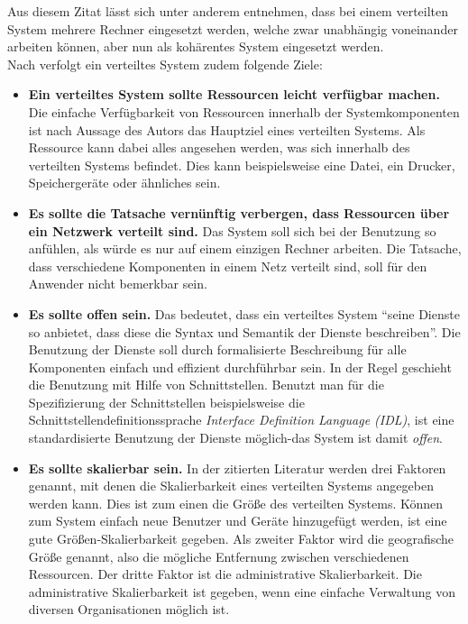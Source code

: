 Aus diesem Zitat lässt sich unter anderem entnehmen, dass bei einem verteilten System mehrere Rechner eingesetzt werden, welche zwar unabhängig voneinander arbeiten können, aber nun als kohärentes System eingesetzt werden. \\
Nach \citep{tanenbaum} verfolgt ein verteiltes System zudem folgende Ziele: 
\begin{itemize}
	\item \textbf{Ein verteiltes System sollte Ressourcen leicht verfügbar machen.}
	Die einfache Verfügbarkeit von Ressourcen innerhalb der Systemkomponenten ist nach Aussage des Autors das Hauptziel eines verteilten Systems. Als Ressource kann dabei alles angesehen werden, was sich innerhalb des verteilten Systems befindet. Dies kann beispielsweise eine Datei, ein Drucker, Speichergeräte oder ähnliches sein. 
	\item \textbf{Es sollte die Tatsache vernünftig verbergen, dass Ressourcen über ein Netzwerk verteilt sind.}
	Das System soll sich bei der Benutzung so anfühlen, als würde es nur auf einem einzigen Rechner arbeiten. Die Tatsache, dass verschiedene Komponenten in einem Netz verteilt sind, soll für den Anwender nicht bemerkbar sein.
	\item \textbf{Es sollte offen sein.}
	Das bedeutet, dass ein verteiltes System \enquote{seine Dienste so anbietet, dass diese die Syntax und Semantik der Dienste beschreiben}. Die Benutzung der Dienste soll durch formalisierte Beschreibung für alle Komponenten einfach und effizient durchführbar sein. In der Regel geschieht die Benutzung mit Hilfe von Schnittstellen. Benutzt man für die Spezifizierung der Schnittstellen beispielsweise die Schnittstellendefinitionssprache \emph{Interface Definition Language (IDL)}, ist eine standardisierte Benutzung der Dienste möglich-das System ist damit \emph{offen}.
	\item \textbf{Es sollte skalierbar sein.}
In der zitierten Literatur werden drei Faktoren genannt, mit denen die Skalierbarkeit eines verteilten Systems angegeben werden kann. Dies ist zum einen die Größe des verteilten Systems. Können zum System einfach neue Benutzer und Geräte hinzugefügt werden, ist eine gute Größen-Skalierbarkeit gegeben. Als zweiter Faktor wird die geografische Größe genannt, also die mögliche Entfernung zwischen verschiedenen Ressourcen. Der dritte Faktor ist die administrative Skalierbarkeit. Die administrative Skalierbarkeit ist gegeben, wenn eine einfache Verwaltung von diversen Organisationen möglich ist. 
\end{itemize}
